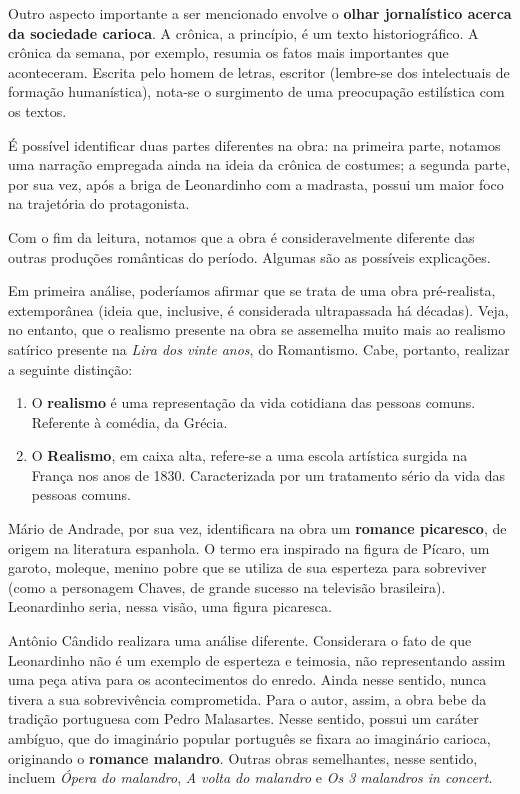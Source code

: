 Outro aspecto importante a ser mencionado envolve o \textbf{olhar jornalístico acerca da sociedade carioca}. A crônica, a princípio, é um texto historiográfico. A crônica da semana, por exemplo, resumia os fatos mais importantes que aconteceram. Escrita pelo homem de letras, escritor (lembre-se dos intelectuais de formação humanística), nota-se o surgimento de uma preocupação estilística com os textos.

É possível identificar duas partes diferentes na obra: na primeira parte, notamos uma narração empregada ainda na ideia da crônica de costumes; a segunda parte, por sua vez, após a briga de Leonardinho com a madrasta, possui um maior foco na trajetória do protagonista.

Com o fim da leitura, notamos que a obra é consideravelmente diferente das outras produções românticas do período. Algumas são as possíveis explicações.

Em primeira análise, poderíamos afirmar que se trata de uma obra pré-realista, extemporânea (ideia que, inclusive, é considerada ultrapassada há décadas). Veja, no entanto, que o realismo presente na obra se assemelha muito mais ao realismo satírico presente na \textit{Lira dos vinte anos}, do Romantismo. Cabe, portanto, realizar a seguinte distinção:

\begin{enumerate}
\item O \textbf{realismo} é uma representação da vida cotidiana das pessoas comuns. Referente à comédia, da Grécia.
\item O \textbf{Realismo}, em caixa alta, refere-se a uma escola artística surgida na França nos anos de 1830. Caracterizada por um tratamento sério da vida das pessoas comuns.
\end{enumerate}

Mário de Andrade, por sua vez, identificara na obra um \textbf{romance picaresco}, de origem na literatura espanhola. O termo era inspirado na figura de Pícaro, um garoto, moleque, menino pobre que se utiliza de sua esperteza para sobreviver (como a personagem Chaves, de grande sucesso na televisão brasileira). Leonardinho seria, nessa visão, uma figura picaresca.

Antônio Cândido realizara uma análise diferente. Considerara o fato de que Leonardinho não é um exemplo de esperteza e teimosia, não representando assim uma peça ativa para os acontecimentos do enredo. Ainda nesse sentido, nunca tivera a sua sobrevivência comprometida. Para o autor, assim, a obra bebe da tradição portuguesa com Pedro Malasartes. Nesse sentido, possui um caráter ambíguo, que do imaginário popular português se fixara ao imaginário carioca, originando o \textbf{romance malandro}. Outras obras semelhantes, nesse sentido, incluem \textit{Ópera do malandro}, \textit{A volta do malandro} e \textit{Os 3 malandros in concert}.


